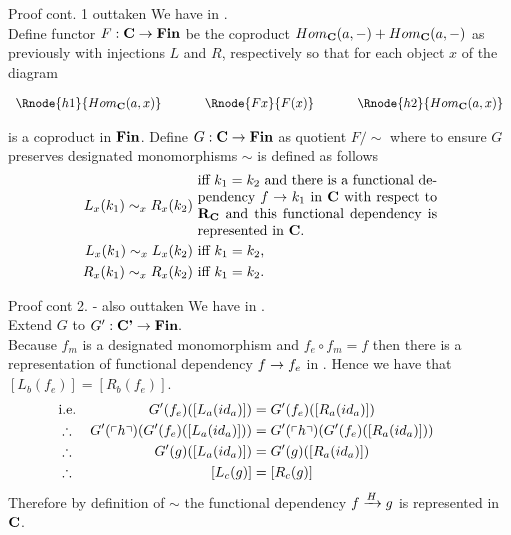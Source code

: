 \begin{frame}{Proof cont. 1 outtaken}
We have \fgsourcediagram in \catc. \\
\medskip
Define functor $F: \catc \morph \Fin$ be the coproduct $Hom_{\catc}(a,-) + Hom_{\catc}(a,-)$
as previously with injections $L$ and $R$, respectively so that
for each object $x$ of \catcw the diagram
\begin{center}
$
\begin{array}{c p{0.5cm} c p{0.5cm} c  }
\Rnode{h1}{Hom_{\catc}(a,x)}  &&\Rnode{Fx}{F(x)}  &&   \Rnode{h2}{Hom_{\catc}(a,x)}       
\end{array} 
$
\end{center}
is a coproduct in $\Fin$.
\medskip
Define $G: \catc \morph \Fin$ as quotient $F/\sim$ where 
to ensure $G$ preserves designated monomorphisms  $\sim$ is defined as follows
\begin{align*}
L_x(k_1) \sim_x R_x(k_2) & \mbox{ \parbox{6cm}{iff  $k_1=k_2$ and there is a functional dependency 
$f \morph k_1$ in \catcw with respect to $\reqtc$ and  this functional dependency is represented in \catc.}}\\
L_x(k_1) \sim_x L_x(k_2) & \mbox{ iff $k_1 = k_2$,} \\
R_x(k_1) \sim_x R_x(k_2) & \mbox{ iff $k_1 = k_2$.} \\
\end{align*} 
\end{frame}

\begin{frame}{Proof cont 2. - also outtaken}
We have   in \catcp.\\
\medskip
Extend $G$ to $G':\catcp \morph \Fin.$ \\
Because $f_m$ is a designated monomorphism and $f_e \circ f_m = f$ then
there is a representation of functional dependency $f \morph f_e$ in \catc.
Hence  we have that $[L_b(f_e)]= [R_b(f_e)]$.
\medskip
\begin{align*}
&\mbox{i.e.}& G'(f_e)([L_a(id_a)])              &= G'(f_e)([R_a(id_a)])       \\
&\therefore & G'(\qq{h}) (G'(f_e)([L_a(id_a)])) &= G'(\qq{h}) (G'(f_e)([R_a(id_a)])) \\
&\therefore & G'(g)([L_a(id_a)])              &= G'(g)([R_a(id_a)]) & &    \\
&\therefore & [L_c(g)] &= [R_c(g)] 
\end{align*}
Therefore by definition of $\sim$ the functional dependency
$\fundep{H}{f}{g}$ is represented in $\catc$.
\end{frame}

